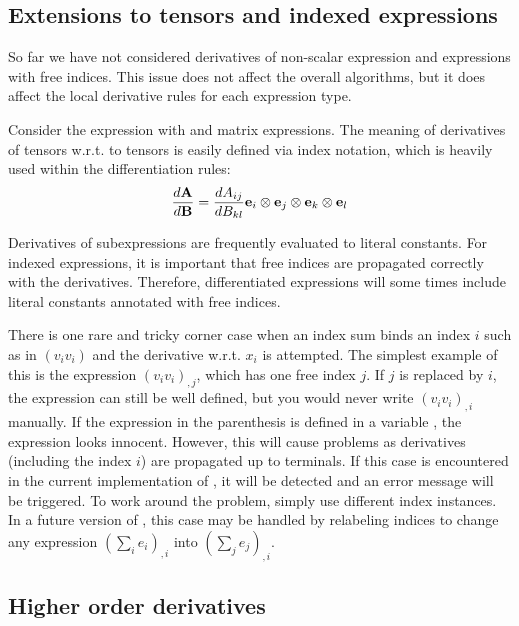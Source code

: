 \subsection{Extensions to tensors and indexed expressions}

So far we have not considered derivatives of non-scalar expression and
expressions with free indices.  This issue does not affect the overall
algorithms, but it does affect the local derivative rules for each
expression type.

Consider the expression  with  and
 matrix expressions.  The meaning of derivatives of tensors
w.r.t. to tensors is easily defined via index notation, which is
heavily used within the differentiation rules:
\begin{align}
\frac{d\mathbf{A}}{d\mathbf{B}} = \frac{dA_{ij}}{d B_{kl}} \mathbf{e}_i\otimes\mathbf{e}_j\otimes\mathbf{e}_k\otimes\mathbf{e}_l
\end{align}

Derivatives of subexpressions are frequently evaluated to literal
constants.  For indexed expressions, it is important that free indices
are propagated correctly with the derivatives.  Therefore,
differentiated expressions will some times include literal constants
annotated with free indices.

There is one rare and tricky corner case when an index sum binds an
index $i$ such as in $(v_i v_i)$ and the derivative w.r.t. $x_i$ is
attempted.  The simplest example of this is the expression $(v_i
v_i)_{,j}$, which has one free index $j$.  If $j$ is replaced by $i$,
the expression can still be well defined, but you would never write
$(v_i v_i)_{,i}$ manually.  If the expression in the parenthesis is
defined in a variable , the expression
 looks innocent. However, this will cause problems as
derivatives (including the index $i$) are propagated up to terminals.
If this case is encountered in the current implementation of \ufl{},
it will be detected and an error message will be triggered.
To work around the problem, simply use different index instances.
In a future version of \ufl{}, this case may be handled by relabeling
indices to change any expression $(\sum_i e_i)_{,i}$ into $(\sum_j e_j)_{,i}$.

\subsection{Higher order derivatives}

